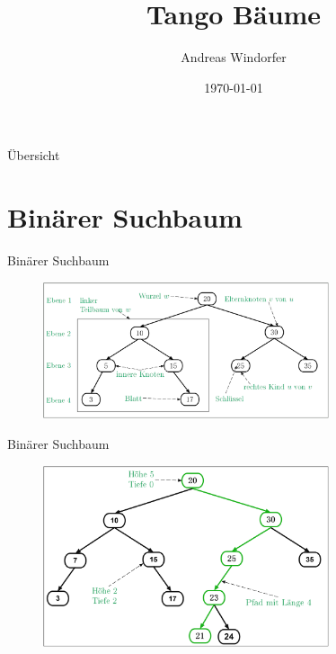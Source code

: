 \documentclass[11pt]{beamer}
\begin{document}
	\author{Andreas Windorfer}
	\title{Tango Bäume}
	\date{\today}
	\begin{frame}{}
		\titlepage
	\end{frame}
		\begin{frame} {Übersicht}
		\tableofcontents[]   
		
	\end{frame}
	
	\section{Binärer Suchbaum}
	
	
		\begin{frame} {Binärer Suchbaum}
			\begin{figure}[h]
				\centering
				\includegraphics[width=0.75\textwidth]{"Medien/pres/ioSuchbaum"}
			\end{figure}    
		\end{frame}

			\begin{frame} {Binärer Suchbaum}
			\begin{figure}[h]
				\centering
				\includegraphics[width=0.75\textwidth]{"Medien/pres/suchbaum2_2"}
			\end{figure}    
		\end{frame}
\end{document}
